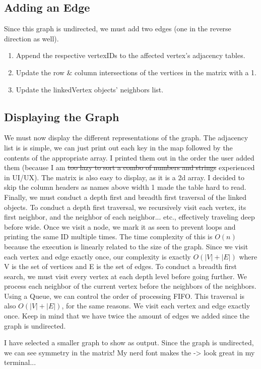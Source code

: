 \documentclass[letterpaper, 10pt]{article}
\begin{document}
\subsection{Adding an Edge}
Since this graph is undirected, we must add two edges (one in the reverse direction as well).
\begin{enumerate}
    \item Append the respective vertexIDs to the affected vertex's adjacency tables.
    \item Update the row \& column intersections of the vertices in the matrix with a 1.
    \item Update the linkedVertex objects' neighbors list.
\end{enumerate}
\newpage


\subsection{Displaying the Graph}
We must now display the different representations of the graph. The adjacency list is is simple, we can just print out each key in the map followed by the contents of the appropriate array. I printed them out in the order the user added them (because I am \sout{too lazy to sort a combo of numbers and strings} experienced in UI/UX). The matrix is also easy to display, as it is a 2d array. I decided to skip the column headers as names above width 1 made the table hard to read. Finally, we must conduct a depth first and breadth first traversal of the linked objects. \newline \indent To conduct a depth first traversal, we recursively visit each vertex, its first neighbor, and the neighbor of each neighbor... etc., effectively traveling deep before wide. Once we visit a node, we mark it as seen to prevent loops and printing the same ID multiple times. The time complexity of this is $O(n)$ because the execution is linearly related to the size of the graph. Since we visit each vertex and edge exactly once, our complexity is exactly $O(|V| + |E|)$ where V is the set of vertices and E is the set of edges. \newline \indent To conduct a breadth first search, we must visit every vertex at each depth level before going further. We process each neighbor of the current vertex before the neighbors of the neighbors. Using a Queue, we can control the order of processing FIFO. This traversal is also $O(|V| + |E|)$, for the same reasons. We visit each vertex and edge exactly once. Keep in mind that we have twice the amount of edges we added since the graph is undirected.

I have selected a smaller graph to show as output. Since the graph is undirected, we can see symmetry in the matrix! My nerd font makes the -\textgreater{} look great in my terminal... \newline

\end{document}
